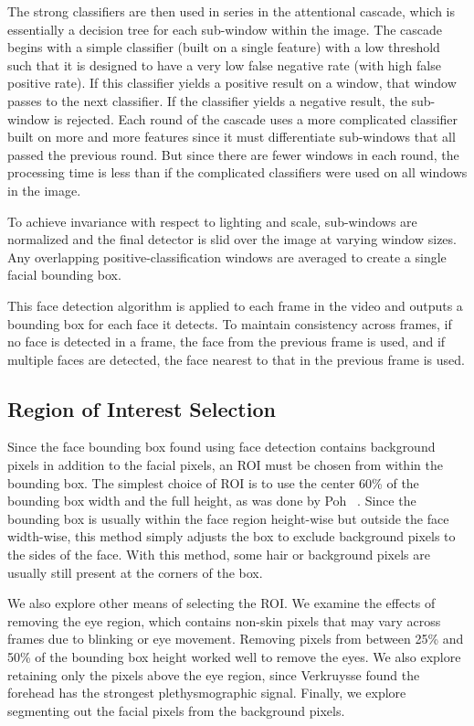 \documentclass[10pt,twocolumn,letterpaper]{article}
\begin{document}
The strong classifiers are then used in series in the attentional cascade, which is essentially a decision tree for each sub-window within the image. The cascade begins with a simple classifier (built on a single feature) with a low threshold such that it is designed to have a very low false negative rate (with high false positive rate). If this classifier yields a positive result on a window, that window passes to the next classifier. If the classifier yields a negative result, the sub-window is rejected. Each round of the cascade uses a more complicated classifier built on more and more features since it must differentiate sub-windows that all passed the previous round. But since there are fewer windows in each round, the processing time is less than if the complicated classifiers were used on all windows in the image.

To achieve invariance with respect to lighting and scale, sub-windows are normalized and the final detector is slid over the image at varying window sizes. Any overlapping positive-classification windows are averaged to create a single facial bounding box.

This face detection algorithm is applied to each frame in the video and outputs a bounding box for each face it detects. To maintain consistency across frames, if no face is detected in a frame, the face from the previous frame is used, and if multiple faces are detected, the face nearest to that in the previous frame is used. 

\subsection{Region of Interest Selection}

Since the face bounding box found using face detection contains background pixels in addition to the facial pixels, an ROI must be chosen from within the bounding box. The simplest choice of ROI is to use the center 60\% of the bounding box width and the full height, as was done by Poh \etal~\cite{Poh:2010aa}. Since the bounding box is usually within the face region height-wise but outside the face width-wise, this method simply adjusts the box to exclude background pixels to the sides of the face. With this method, some hair or background pixels are usually still present at the corners of the box. 

We also explore other means of selecting the ROI. We examine the effects of removing the eye region, which contains non-skin pixels that may vary across frames due to blinking or eye movement. Removing pixels from between 25\% and 50\% of the bounding box height worked well to remove the eyes. We also explore retaining only the pixels above the eye region, since Verkruysse \etal found the forehead has the strongest plethysmographic signal. Finally, we explore segmenting out the facial pixels from the background pixels.
\end{document}
